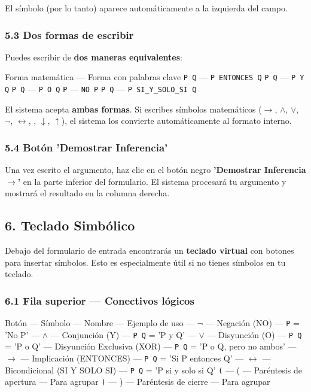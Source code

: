 \documentclass[11pt,a4paper]{article}
\begin{document}
El símbolo \texttt{} (por lo tanto) aparece automáticamente a la izquierda del campo.

\subsubsection{5.3 Dos formas de escribir}

Puedes escribir de \textbf{dos maneras equivalentes}:

Forma matemática --- Forma con palabras clave
\texttt{P  Q} --- \texttt{P ENTONCES Q}
\texttt{P  Q} --- \texttt{P Y Q}
\texttt{P  Q} --- \texttt{P O Q}
\texttt{P} --- \texttt{NO P}
\texttt{P  Q} --- \texttt{P SI\_Y\_SOLO\_SI Q}

El sistema acepta \textbf{ambas formas}. Si escribes símbolos matemáticos ($ \to $, $ \land $, $ \lor $, $ \lnot $, $ \leftrightarrow $, , $ \downarrow $, $ \uparrow $), el sistema los convierte automáticamente al formato interno.

\subsubsection{5.4 Botón 'Demostrar Inferencia'}

Una vez escrito el argumento, haz clic en el botón negro \textbf{'Demostrar Inferencia $ \to $'} en la parte inferior del formulario. El sistema procesará tu argumento y mostrará el resultado en la columna derecha.

\hrulefill

\subsection{6. Teclado Simbólico}

Debajo del formulario de entrada encontrarás un \textbf{teclado virtual} con botones para insertar símbolos. Esto es especialmente útil si no tienes símbolos en tu teclado.

\subsubsection{6.1 Fila superior --- Conectivos lógicos}

Botón --- Símbolo --- Nombre --- Ejemplo de uso
\texttt{} --- $ \lnot $ --- Negación (NO) --- \texttt{P} = 'No P'
\texttt{} --- $ \land $ --- Conjunción (Y) --- \texttt{P  Q} = 'P y Q'
\texttt{} --- $ \lor $ --- Disyunción (O) --- \texttt{P  Q} = 'P o Q'
\texttt{} --- Disyunción Exclusiva (XOR) --- \texttt{P  Q} = 'P o Q, pero no ambos'
\texttt{} --- $ \to $ --- Implicación (ENTONCES) --- \texttt{P  Q} = 'Si P entonces Q'
\texttt{} --- $ \leftrightarrow $ --- Bicondicional (SI Y SOLO SI) --- \texttt{P  Q} = 'P si y solo si Q'
\texttt{(} --- ( --- Paréntesis de apertura --- Para agrupar
\texttt{)} --- ) --- Paréntesis de cierre --- Para agrupar
\end{document}
